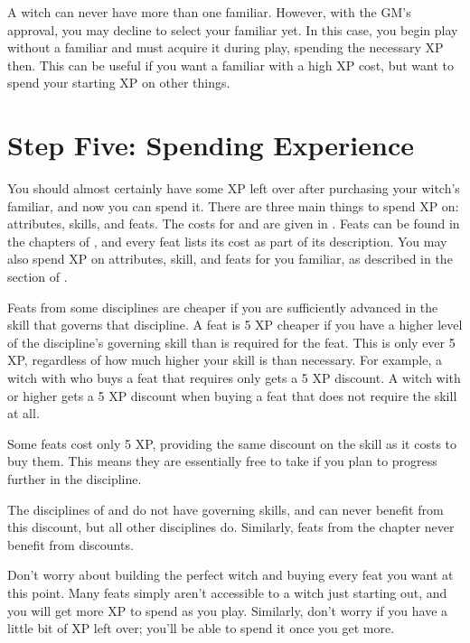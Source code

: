 A witch can never have more than one familiar.
However, with the GM's approval, you may decline to select your familiar yet.
In this case, you begin play without a familiar and must acquire it during play, spending the necessary XP then.
This can be useful if you want a familiar with a high XP cost, but want to spend your starting XP on other things.

\section{Step Five: Spending Experience}

You should almost certainly have some XP left over after purchasing your witch's familiar, and now you can spend it.
There are three main things to spend XP on: attributes, skills, and feats.
The costs for  and  are given in .
Feats can be found in the chapters of , and every feat lists its cost as part of its description.
You may also spend XP on attributes, skill, and feats for you familiar, as described in the  section of .

Feats from some disciplines are cheaper if you are sufficiently advanced in the skill that governs that discipline.
A feat is 5 XP cheaper if you have a higher level of the discipline's governing skill than is required for the feat.
This is only ever 5 XP, regardless of how much higher your skill is than necessary.
For example, a witch with  who buys a  feat that requires only  gets a 5 XP discount.
A witch with  or higher gets a 5 XP discount when buying a  feat that does not require the  skill at all.

Some feats cost only 5 XP, providing the same discount on the skill as it costs to buy them.
This means they are essentially free to take if you plan to progress further in the discipline.

The disciplines of  and  do not have governing skills, and can never benefit from this discount, but all other disciplines do.
Similarly, feats from the  chapter never benefit from discounts.

Don't worry about building the perfect witch and buying every feat you want at this point.
Many feats simply aren't accessible to a witch just starting out, and you will get more XP to spend as you play.
Similarly, don't worry if you have a little bit of XP left over; you'll be able to spend it once you get more.

